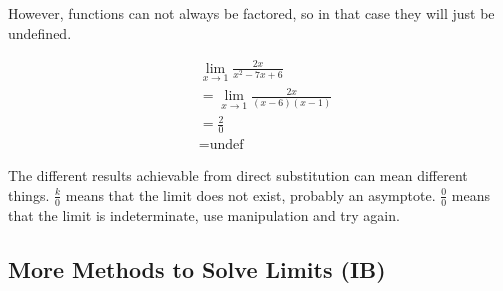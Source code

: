 \documentclass[12pt]{article}
\begin{document}
\noindent However, functions can not always be factored, so in that case they will just be undefined.

\begin{align*}
     & \lim_{x \to 1} \frac{2x}{x^2 - 7x + 6} \\[6pt]
     & = \lim_{x \to 1} \frac{2x}{(x-6)(x-1)} \\
     & = \frac{2}{0}                          \\
     & = \text{undef}
\end{align*}

The different results achievable from direct substitution can mean different things. $\frac{k}{0}$ means that the limit does not exist, probably an asymptote. $\frac{0}{0}$ means that the limit is indeterminate, use manipulation and try again.

\subsection{More Methods to Solve Limits (IB)}
\end{document}
